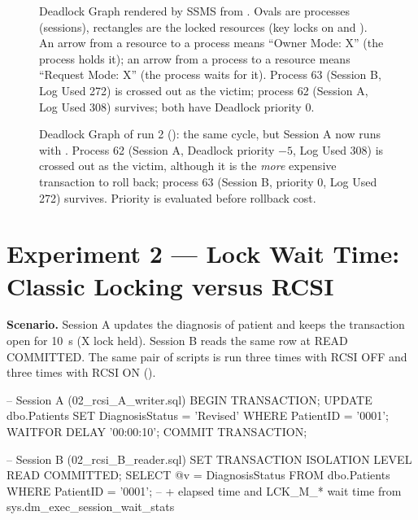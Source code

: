 \begin{figure}[H]
  \centering
  \caption{Deadlock Graph rendered by SSMS from . Ovals are processes (sessions), rectangles are the locked resources (key locks on  and ). An arrow from a resource to a process means ``Owner Mode: X'' (the process holds it); an arrow from a process to a resource means ``Request Mode: X'' (the process waits for it). Process 63 (Session B, Log Used 272) is crossed out as the victim; process 62 (Session A, Log Used 308) survives; both have Deadlock priority 0.}
  \label{fig:r5-deadlock-ssms}
\end{figure}

\begin{figure}[H]
  \centering
  \caption{Deadlock Graph of run 2 (): the same cycle, but Session A now runs with . Process 62 (Session A, Deadlock priority $-5$, Log Used 308) is crossed out as the victim, although it is the \emph{more} expensive transaction to roll back; process 63 (Session B, priority 0, Log Used 272) survives. Priority is evaluated before rollback cost.}
  \label{fig:r5-deadlock-ssms-run2}
\end{figure}

\section{Experiment 2 --- Lock Wait Time: Classic Locking versus RCSI}
\label{sec:r5-2-rcsi}

\textbf{Scenario.} Session A updates the diagnosis of patient  and keeps the transaction open for 10~s (X lock held). Session B reads the same row at READ COMMITTED. The same pair of scripts is run three times with RCSI OFF and three times with RCSI ON ().

\begin{SQLCode}
-- Session A (02_rcsi_A_writer.sql)
BEGIN TRANSACTION;
    UPDATE dbo.Patients SET DiagnosisStatus = 'Revised' WHERE PatientID = '0001';
    WAITFOR DELAY '00:00:10';
COMMIT TRANSACTION;

-- Session B (02_rcsi_B_reader.sql)
SET TRANSACTION ISOLATION LEVEL READ COMMITTED;
SELECT @v = DiagnosisStatus FROM dbo.Patients WHERE PatientID = '0001';
-- + elapsed time and LCK_M_* wait time from sys.dm_exec_session_wait_stats
\end{SQLCode}

